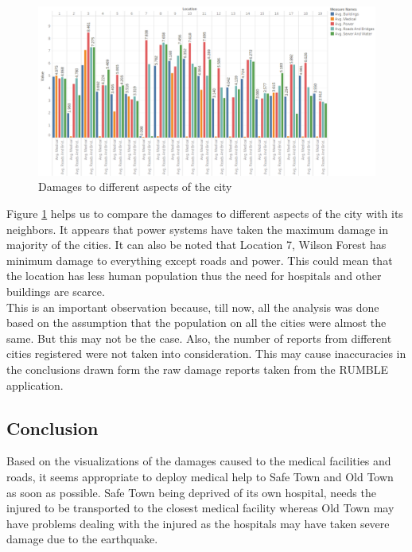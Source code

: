 \documentclass[12pt]{extarticle}
\begin{document}
\begin{figure}[H]
\centering
	\includegraphics[width=\linewidth]{Images/AllSeperate.png}
	\caption{Damages to different aspects of the city}
	\label{fig:allseperate}
\end{figure}

Figure \ref{fig:allseperate} helps us to compare the damages to different aspects of the city with its neighbors.  It appears that power systems have taken the maximum damage in majority of the cities. It can also be noted that Location 7, Wilson Forest has minimum damage to everything except roads and power. This could mean that the location has less human population thus the need for hospitals and other buildings are scarce. \\

This is an important observation because, till now, all the analysis was done based on the assumption that the population on all the cities were almost the same. But this may not be the case. Also, the number of reports from different cities registered were not taken into consideration. This may cause inaccuracies in the conclusions drawn form the raw damage reports taken from the RUMBLE application. 

 \newpage
\begin{centering}
	\section{Conclusion}
\end{centering}

Based on the visualizations of the damages caused to the medical facilities and roads, it seems appropriate to deploy medical help to Safe Town and Old Town as soon as possible. Safe Town being deprived of its own hospital, needs the injured to be transported to the closest medical facility whereas Old Town may have problems dealing with the injured as the hospitals may have taken severe damage due to the earthquake. \\
\end{document}
